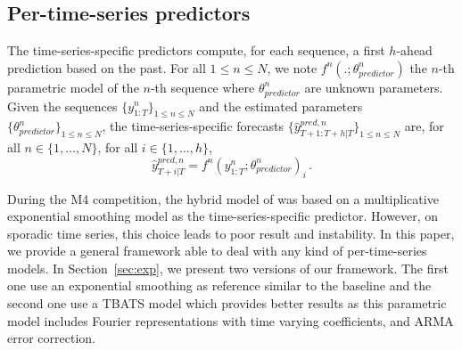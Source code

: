 \documentclass{article} %
\newcommand{\ts}{y}
\newcommand{\tspred}{\hat{\ts}}
\newcommand{\stat}{f}
\newcommand{\statparam}{\theta_{predictor}}
\newcommand{\lag}{h}
\begin{document}
\subsection{Per-time-series predictors}
The time-series-specific predictors compute, for each sequence, a first $\lag$-ahead prediction based on the past. For all $1\leqslant n \leqslant N$, we note $\stat^n(.;\statparam^n)$ the $n$-th parametric model of the $n$-th sequence where $\statparam^n$ are  unknown parameters. Given the sequences $\{\ts^n_{1:T}\}_{1\leqslant n \leqslant N}$ and the estimated  parameters $\{\statparam^n\}_{1\leqslant n \leqslant N}$, the time-series-specific forecasts $\{\tspred^{pred,n}_{T+1:T+\lag|T}\}_{1\leqslant n \leqslant N}$ are, for all $n \in \{1,\ldots,N\}$, for all $i \in \{1,\ldots,\lag\}$,
$$
\tspred^{pred,n}_{T+i|T} = \stat^n(\ts^n_{1:T};\statparam^n)_i\,.
$$

During the M4 competition, the hybrid model of \cite{smyl2020hybrid} was based on a multiplicative exponential smoothing model as the time-series-specific predictor. However, on sporadic time series, this choice leads to poor result and instability. In this paper, we provide a general framework able to deal with any kind of per-time-series models. In Section~\ref{sec:exp}, we present two versions of our framework. The first one use an  exponential smoothing as reference similar to the baseline \cite{smyl2020hybrid} and the second one use a TBATS model \cite{doi:10.1198/jasa.2011.tm09771} which provides better results as this parametric model includes  Fourier representations with time varying coefficients, and ARMA error correction. %
\end{document}
